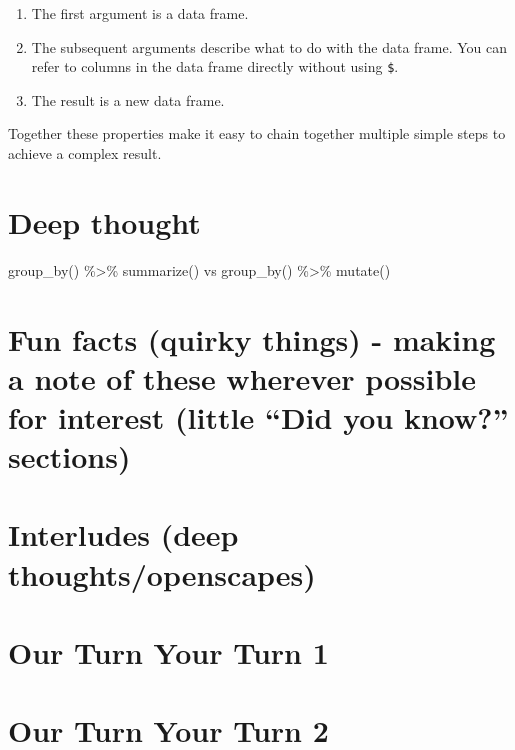 \documentclass[]{book}
\providecommand{\tightlist}{%
  \setlength{\itemsep}{0pt}\setlength{\parskip}{0pt}}
\begin{document}
\begin{enumerate}
\def\labelenumi{\arabic{enumi}.}
\tightlist
\item
  The first argument is a data frame.
\item
  The subsequent arguments describe what to do with the data frame. You can refer to columns in the data frame directly without using \texttt{\$}.
\item
  The result is a new data frame.
\end{enumerate}

Together these properties make it easy to chain together multiple simple steps to achieve a complex result.

\hypertarget{deep-thought-1}{%
\section{Deep thought}\label{deep-thought-1}}

group\_by() \%\textgreater{}\% summarize() vs
group\_by() \%\textgreater{}\% mutate()

\hypertarget{fun-facts-quirky-things---making-a-note-of-these-wherever-possible-for-interest-little-did-you-know-sections-1}{%
\section{Fun facts (quirky things) - making a note of these wherever possible for interest (little ``Did you know?'' sections)}\label{fun-facts-quirky-things---making-a-note-of-these-wherever-possible-for-interest-little-did-you-know-sections-1}}

\hypertarget{interludes-deep-thoughtsopenscapes-3}{%
\section{Interludes (deep thoughts/openscapes)}\label{interludes-deep-thoughtsopenscapes-3}}

\hypertarget{our-turn-your-turn-1-1}{%
\section{Our Turn Your Turn 1}\label{our-turn-your-turn-1-1}}

\hypertarget{our-turn-your-turn-2-1}{%
\section{Our Turn Your Turn 2}\label{our-turn-your-turn-2-1}}
\end{document}
